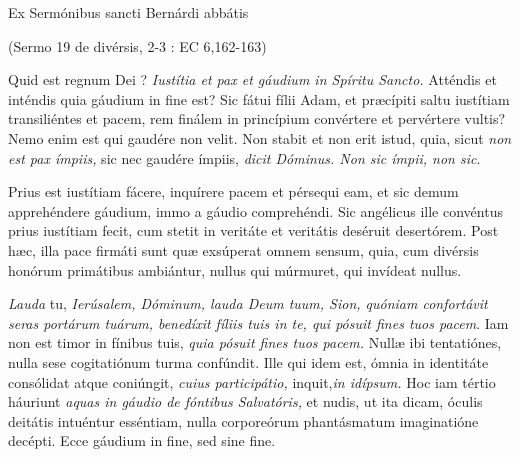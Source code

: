 \documentclass[options]{article}
\begin{document}
	Ex Sermónibus sancti Bernárdi abbátis
	\begin{flushright}
			(Sermo 19 de divérsis, 2-3 : EC 6,162-163)
	\end{flushright}
Quid est regnum Dei ? \emph{Iustítia et pax et gáudium in Spíritu Sancto.} Atténdis et inténdis quia gáudium in fine est? Sic fátui fílii Adam, et præcípiti saltu iustítiam transiliéntes et pacem, rem finálem in princípium convértere et pervértere vultis? Nemo enim est qui gaudére non velit. Non stabit et non erit istud, quia, sicut \emph{non est pax ímpiis,} sic nec gaudére ímpiis, \emph{dicit Dóminus. Non sic ímpii, non sic}. 

Prius est iustítiam fácere, inquírere pacem et pérsequi eam, et sic demum apprehéndere gáudium, immo a gáudio comprehéndi. Sic angélicus ille convéntus prius iustítiam fecit, cum stetit in veritáte et veritátis deséruit desertórem. Post hæc, illa pace firmáti sunt quæ exsúperat omnem sensum, quia, cum divérsis honórum primátibus ambiántur, nullus qui múrmuret, qui invídeat nullus.

\emph{Lauda} tu, \emph{Ierúsalem, Dóminum, lauda Deum tuum, Sion, quóniam confortávit seras portárum tuárum, benedíxit fíliis tuis in te, qui pósuit fines tuos pacem}. Iam non est timor in fínibus tuis, \emph{quia pósuit fines tuos pacem.}  Nullæ ibi tentatiónes, nulla sese cogitatiónum turma confúndit. Ille qui idem est, ómnia in identitáte consólidat atque coniúngit, \emph{cuius participátio,} inquit,\emph{in idípsum.} Hoc iam tértio háuriunt \emph{aquas in gáudio de fóntibus Salvatóris,} et nudis, ut ita dicam, óculis deitátis intuéntur esséntiam, nulla corporeórum phantásmatum imaginatióne decépti. Ecce gáudium in fine, sed sine fine.
\end{document}
